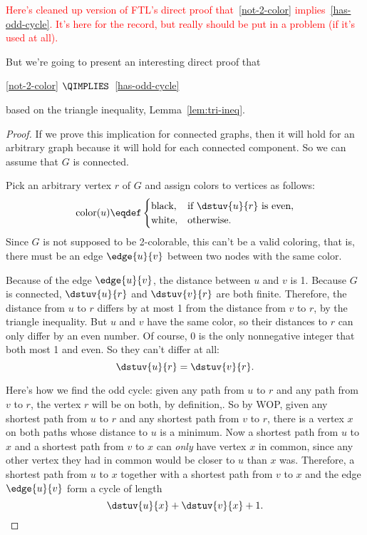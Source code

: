 \begin{editingnotes}

\textcolor{red}{Here's cleaned up version of FTL's direct proof
  that~\ref{not-2-color} implies~\ref{has-odd-cycle}.  It's here for
  the record, but really should be put in a problem (if it's used at
  all).}

But we're going to present an interesting direct proof that

\ref{not-2-color} $\QIMPLIES$~\ref{has-odd-cycle}

based on the triangle inequality, Lemma~\ref{lem:tri-ineq}.

\begin{proof}
If we prove this implication for connected graphs, then it will hold
for an arbitrary graph because it will hold for each connected
component.  So we can assume that $G$ is connected.

Pick an arbitrary vertex $r$ of $G$ and assign colors to vertices as
follows:
\begin{equation}\label{colorurule}
\text{color}(u) \eqdef
             \begin{cases}
                   \text{black}, & \text{if $\dstuv{u}{r}$ is even},\\
                   \text{white}, & \text{otherwise}.
             \end{cases}
\end{equation}
Since $G$ is not supposed to be 2-colorable, this can't be a valid
coloring, that is, there must be an edge $\edge{u}{v}$ between two nodes
with the same color.

Because of the edge $\edge{u}{v}$, the distance between $u$ and $v$ is
1.  Because $G$ is connected, $\dstuv{u}{r}$ and $\dstuv{v}{r}$ are
both finite.  Therefore, the distance from $u$ to $r$ differs by at
most 1 from the distance from $v$ to $r$, by the triangle inequality.
But $u$ and $v$ have the same color, so their distances to $r$ can
only differ by an even number.  Of course, 0 is the only nonnegative
integer that both most 1 and even.  So they can't differ at all:
\begin{equation}\label{dstur=vr}
\dstuv{u}{r} = \dstuv{v}{r}.
\end{equation}

Here's how we find the odd cycle: given any path from $u$ to $r$ and
any path from $v$ to $r$, the vertex $r$ will be on both, by
definition,.  So by WOP, given any shortest path from $u$ to $r$ and
any shortest path from $v$ to $r$, there is a vertex $x$ on both paths
whose distance to $u$ is a minimum.  Now a shortest path from $u$ to
$x$ and a shortest path from $v$ to $x$ can \emph{only} have vertex
$x$ in common, since any other vertex they had in common would be
closer to $u$ than $x$ was.  Therefore, a shortest path from $u$ to
$x$ together with a shortest path from $v$ to $x$ and the edge
$\edge{u}{v}$ form a cycle of length
\begin{equation}\label{uxvx1}
\dstuv{u}{x}+  \dstuv{v}{x} +1.
\end{equation}


\end{proof}
\end{editingnotes}
